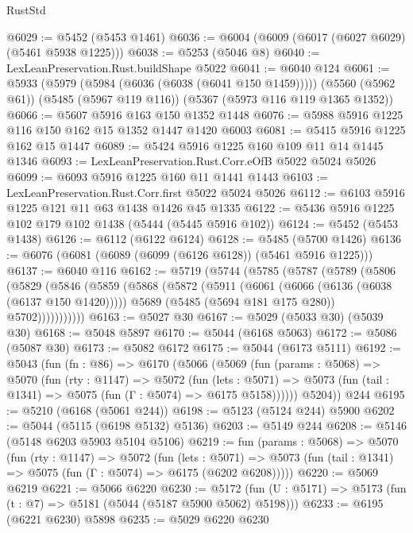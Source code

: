 \begin{lexlean}{RustStd}
\begin{coremodule}
@6029 := @5452 (@5453 @1461)
@6036 := @6004 (@6009 (@6017 (@6027 @6029) (@5461 @5938 @1225)))
@6038 := @5253 (@5046 @8)
@6040 := LexLeanPreservation.Rust.buildShape @5022
@6041 := @6040 @124
@6061 := @5933
    (@5979 (@5984 (@6036 (@6038 (@6041 @150 @1459)))))
    (@5560 (@5962 @61))
    (@5485 (@5967 @119 @116))
    (@5367 (@5973 @116 @119 @1365 @1352))
@6066 := @5607 @5916 @163 @150 @1352 @1448
@6076 := @5988 @5916 @1225 @116 @150 @162 @15 @1352 @1447 @1420 @6003
@6081 := @5415 @5916 @1225 @162 @15 @1447
@6089 := @5424 @5916 @1225 @160 @109 @11 @14 @1445 @1346
@6093 := LexLeanPreservation.Rust.Corr.eOfB @5022 @5024 @5026
@6099 := @6093 @5916 @1225 @160 @11 @1441 @1443
@6103 := LexLeanPreservation.Rust.Corr.first @5022 @5024 @5026
@6112 := @6103 @5916 @1225 @121 @11 @63 @1438 @1426 @45 @1335
@6122 := @5436 @5916 @1225 @102 @179 @102 @1438 (@5444 (@5445 @5916 @102))
@6124 := @5452 (@5453 @1438)
@6126 := @6112 (@6122 @6124)
@6128 := @5485 (@5700 @1426)
@6136 := @6076 (@6081 (@6089 (@6099 (@6126 @6128)) (@5461 @5916 @1225)))
@6137 := @6040 @116
@6162 := @5719
    (@5744
      (@5785
        (@5787
          (@5789
            (@5806
              (@5829
                (@5846
                  (@5859
                    (@5868
                      (@5872
                        (@5911
                          (@6061 (@6066 (@6136 (@6038 (@6137 @150 @1420)))))
                          @5689
                          (@5485 (@5694 @181 @175 @280))
                          @5702)))))))))))
@6163 := @5027 @30
@6167 := @5029 (@5033 @30) (@5039 @30)
@6168 := @5048 @5897
@6170 := @5044 (@6168 @5063)
@6172 := @5086 (@5087 @30)
@6173 := @5082 @6172
@6175 := @5044 (@6173 @5111)
@6192 := @5043
    (fun (fn : @86) =>
    @6170
      (@5066
        (@5069
          (fun (params : @5068) =>
          @5070
            (fun (rty : @1147) =>
            @5072
              (fun (lets : @5071) =>
              @5073 (fun (tail : @1341) => @5075 (fun (Γ : @5074) => @6175 @5158))))))
        @5204))
    @244
@6195 := @5210 (@6168 (@5061 @244))
@6198 := @5123 (@5124 @244) @5900
@6202 := @5044 (@5115 (@6198 @5132) @5136)
@6203 := @5149 @244
@6208 := @5146 (@5148 @6203 @5903 @5104 @5106)
@6219 := fun (params : @5068) =>
  @5070
    (fun (rty : @1147) =>
    @5072
      (fun (lets : @5071) =>
      @5073 (fun (tail : @1341) => @5075 (fun (Γ : @5074) => @6175 (@6202 @6208)))))
@6220 := @5069 @6219
@6221 := @5066 @6220
@6230 := @5172 (fun (U : @5171) => @5173 (fun (t : @7) => @5181 (@5044 (@5187 @5900 @5062) @5198)))
@6233 := @6195 (@6221 @6230) @5898
@6235 := @5029 @6220 @6230

\end{coremodule}
\end{lexlean}
